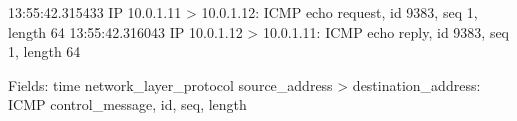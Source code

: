 13:55:42.315433 IP 10.0.1.11 > 10.0.1.12: ICMP echo request, id 9383, seq 1, length 64
13:55:42.316043 IP 10.0.1.12 > 10.0.1.11: ICMP echo reply, id 9383, seq 1, length 64

Fields: time network_layer_protocol source_address > destination_address: ICMP control_message, id, seq, length